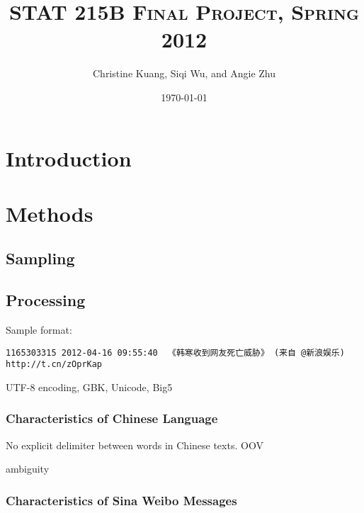 \documentclass[11pt]{article}
\title{\scshape STAT 215B Final Project, Spring 2012}
\author{Christine Kuang, Siqi Wu, and Angie Zhu}
\date{\today} %
\newcommand{\1}[1]{{\mathbf 1}\left\{#1\right\}}        %
\begin{document}
\setlength\footskip{0.5in}


\lstset{
showspaces=false, 
language=R, 
basicstyle=\ttfamily, 
tabsize=3, 
showstringspaces=false, 
columns=flexible%
}

\maketitle

\section{Introduction}


\section{Methods}

\subsection{Sampling}

\subsection{Processing}

Sample format:
\begin{verbatim}
1165303315 2012-04-16 09:55:40  《韩寒收到网友死亡威胁》 (来自 @新浪娱乐) http://t.cn/zOprKap
\end{verbatim}

UTF-8 encoding, GBK, Unicode, Big5

\subsubsection{Characteristics of Chinese Language}
No explicit delimiter between words in Chinese texts.
OOV

ambiguity 

\subsubsection{Characteristics of Sina Weibo Messages}
\end{document}
